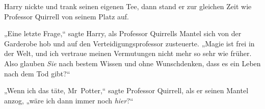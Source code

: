 Harry nickte und trank seinen eigenen Tee, dann stand er zur gleichen Zeit wie Professor Quirrell von seinem Platz auf.

„Eine letzte Frage,“ sagte Harry, als Professor Quirrells Mantel sich von der Garderobe hob und auf den Verteidigungsprofessor zusteuerte. „Magie ist frei in der Welt, und ich vertraue meinen Vermutungen nicht mehr so sehr wie früher. Also glauben \emph{Sie} nach bestem Wissen und ohne Wunschdenken, dass es ein Leben nach dem Tod gibt?“

„Wenn ich das täte, Mr~Potter,“ sagte Professor Quirrell, als er seinen Mantel anzog, „wäre ich dann immer noch \emph{hier}?“

